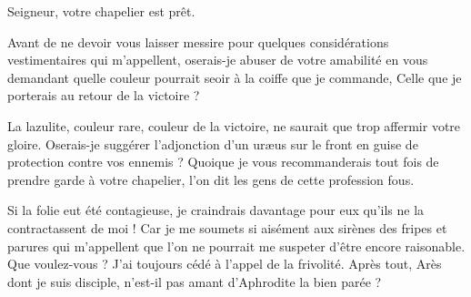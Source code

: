 \begin{drama}
  \intrat{\page}

  \pagespeaks {} Seigneur, votre chapelier est prêt.

  \generalspeaks Avant de ne devoir vous laisser messire \elena{} pour quelques considérations vestimentaires qui m’appellent, oserais-je abuser de votre amabilité en vous demandant quelle couleur pourrait seoir à la coiffe que je commande, Celle que je porterais au retour de la victoire ?

  \elenaspeaks La lazulite, couleur rare, couleur de la victoire, ne saurait que trop affermir votre gloire. Oserais-je suggérer l’adjonction d’un uræus sur le front en guise de protection contre vos ennemis ? Quoique je vous recommanderais tout fois de prendre garde à votre chapelier, l’on dit les gens de cette profession fous.

  \generalspeaks   Si la folie eut été contagieuse, je craindrais davantage pour eux  qu’ils ne la contractassent de moi ! Car je me soumets si aisément aux sirènes des fripes et parures qui m’appellent que l’on ne pourrait me suspeter d’être encore raisonable. Que voulez-vous ? J’ai toujours cédé à l’appel de la frivolité. Après tout, Arès dont je suis disciple, n’est-il pas amant d’Aphrodite la bien parée ?


  \exit{\general}

\end{drama}

\scene

\StageDirII{\elena, \alexas}


